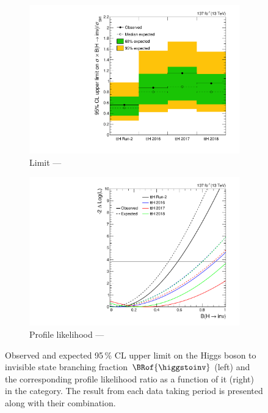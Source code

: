 \begin{figure}[htbp]
    \centering
    \begin{subfigure}[t]{0.45\textwidth}
        \includegraphics[width=\textwidth]{figures/limits/ttH/limit_Run2_ttH.pdf}
        \caption{Limit --- \ttH}
    \end{subfigure}
    \hspace{0.05\textwidth}
    \begin{subfigure}[t]{0.45\textwidth}
        \includegraphics[width=\textwidth]{figures/likelihood_scan/profile_likelihood_scan_Run2_ttH.pdf}
        \caption{Profile likelihood --- \ttH}
    \end{subfigure}
    \caption[Observed and expected 95\,\% CL upper limit on the Higgs boson to invisible state branching fraction $\BRof{\higgstoinv}$ (left) and the corresponding profile likelihood ratio as a function of it (right) in the \ttH category]{Observed and expected 95\,\% CL upper limit on the Higgs boson to invisible state branching fraction $\BRof{\higgstoinv}$ (left) and the corresponding profile likelihood ratio as a function of it (right) in the \ttH category. The result from each data taking period is presented along with their combination.}
    \label{fig:htoinv_limit_ttH}
\end{figure}

